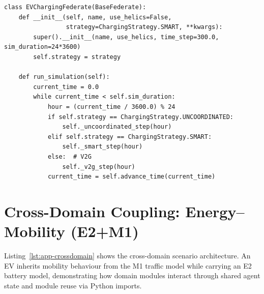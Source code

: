 \begin{listing}[H]
\begin{verbatim}
class EVChargingFederate(BaseFederate):
    def __init__(self, name, use_helics=False,
                 strategy=ChargingStrategy.SMART, **kwargs):
        super().__init__(name, use_helics, time_step=300.0, sim_duration=24*3600)
        self.strategy = strategy

    def run_simulation(self):
        current_time = 0.0
        while current_time < self.sim_duration:
            hour = (current_time / 3600.0) % 24
            if self.strategy == ChargingStrategy.UNCOORDINATED:
                self._uncoordinated_step(hour)
            elif self.strategy == ChargingStrategy.SMART:
                self._smart_step(hour)
            else:  # V2G
                self._v2g_step(hour)
            current_time = self.advance_time(current_time)
\end{verbatim}
\caption{\texttt{scenarios/scenario\_e2.py} --- Strategy pattern for EV charging (condensed)}
\label{lst:app-strategy}
\end{listing}

\section{Cross-Domain Coupling: Energy--Mobility (E2+M1)}
\label{sec:code-crossdomain}

Listing~\ref{lst:app-crossdomain} shows the cross-domain scenario architecture. An EV inherits mobility behaviour from the M1 traffic model while carrying an E2 battery model, demonstrating how domain modules interact through shared agent state and module reuse via Python imports.

